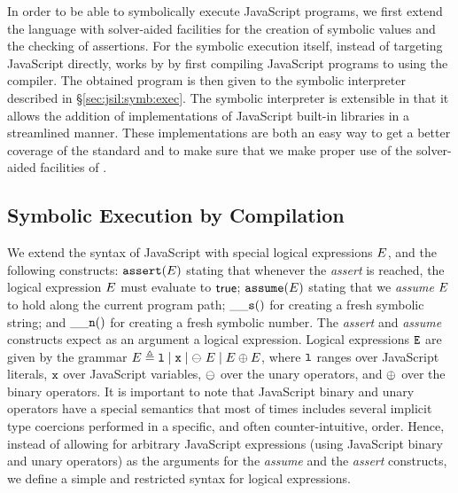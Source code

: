 In order to be able to symbolically execute JavaScript programs, we first extend the language 
with solver-aided facilities for the creation of symbolic values and the checking of assertions. 
For the symbolic execution itself, instead of targeting JavaScript directly, \jilette works by by first 
compiling JavaScript programs to \jsil using the \JSComp compiler.
The obtained \jsil program is then given to the \jsil symbolic interpreter described in \S\ref{sec:jsil:symb:exec}. 
The symbolic interpreter is extensible in that it allows the addition of \rosette implementations of 
JavaScript built-in libraries in a streamlined manner.  
These implementations are both an easy way to get a better coverage of the standard and 
to make sure that we make proper use of the solver-aided facilities of \rosette.    

\subsection{Symbolic Execution by Compilation} 
\label{symb:exec:comp}

We extend the syntax of JavaScript with special logical expressions $E$, 
and the following constructs: %
 $\mathtt{assert}(E)$ stating that whenever the \emph{assert} is reached, 
the logical expression $E$ must evaluate to ${\sf true}$; 
 $\mathtt{assume}(E)$ stating that we \emph{assume} $E$ to hold along the
current program path; 
 $\_\_{\mathtt{s}}()$ for creating a fresh symbolic string; and
 $\_\_{\mathtt{n}}()$ for creating a fresh symbolic number. 
The \emph{assert} and \emph{assume} constructs expect as an argument 
a logical expression. 
Logical expressions $\mathtt{E}$ are given by the grammar 
$E \triangleq \mathtt{l} \mid \mathtt{x} \mid \ominus\ E \mid E \oplus E$, 
where $\mathtt{l}$ ranges over JavaScript literals, $\mathtt{x}$ over JavaScript variables, 
$\ominus$ over the \jsil unary operators, and $\oplus$ over the \jsil binary operators.
It is important to note that JavaScript binary and unary operators have a special 
semantics that most of times includes several implicit type coercions performed
in a specific, and often counter-intuitive, order. 
Hence, instead of allowing for arbitrary JavaScript expressions (using JavaScript 
binary and unary operators) as the arguments for the \emph{assume} and 
the \emph{assert} constructs, we define a simple and restricted syntax for logical expressions.

